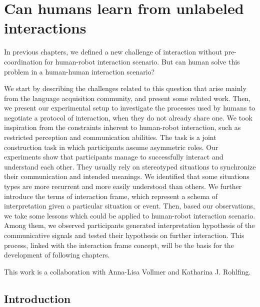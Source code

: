 
\chapter{Can humans learn from unlabeled interactions}
\label{chapter:humanexperiment}
\minitoc


In previous chapters, we defined a new challenge of interaction without pre-coordination for human-robot interaction scenario. But can human solve this problem in a human-human interaction scenario?

We start by describing the challenges related to this question that arise mainly from the language acquisition community, and present some related work. Then, we present our experimental setup to investigate the processes used by humans to negotiate a protocol of interaction, when they do not already share one. We took inspiration from the constraints inherent to human-robot interaction, such as restricted perception and communication abilities. The task is a joint construction task in which participants assume asymmetric roles. Our experiments show that participants manage to successfully interact and understand each other. They usually rely on stereotyped situations to synchronize their communication and intended meanings. We identified that some situations types are more recurrent and more easily understood than others. We further introduce the terms of interaction frame, which represent a schema of interpretation given a particular situation or event. Then, based our observations, we take some lessons which could be applied to human-robot interaction scenario. Among them, we observed participants generated interpretation hypothesis of the communicative signals and tested their hypothesis on further interaction. This process, linked with the interaction frame concept, will be the basis for the development of following chapters. 

This work is a collaboration with Anna-Lisa Vollmer and Katharina J. Rohlfing.

\section{Introduction}

